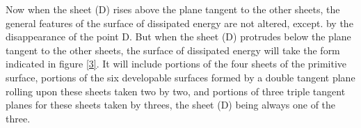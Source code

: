 \documentclass[12pt]{article}
\begin{document}
\begin{figure}[h]
\begin{minipage}{.3\textwidth}
  \label{fig_3}
\end{minipage}
\end{figure}

Now when the sheet (D) rises above the plane tangent to the other sheets, the general features of the surface of dissipated energy are not altered, except. by the disappearance of the point D. But when the sheet (D) protrudes below the plane tangent to the other sheets, the surface of dissipated energy will take the form indicated in figure \ref{3}. It will include portions of the four sheets of the primitive surface, portions of the six developable surfaces formed by a double tangent plane rolling upon these sheets taken two by two, and portions of three triple tangent planes for these sheets taken by threes, the sheet (D) being always one of the three.

\end{document}
